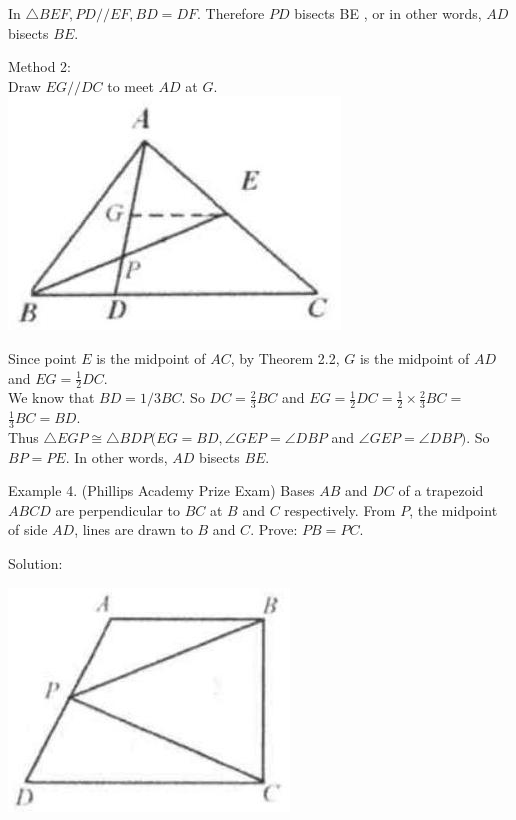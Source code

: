 \documentclass[10pt]{article}
\begin{document}
In \(\triangle B E F, P D / / E F, B D=D F\). Therefore \(P D\) bisects BE , or in other words, \(A D\) bisects \(B E\).

Method 2:\\
Draw \(E G / / D C\) to meet \(A D\) at \(G\).\\
\includegraphics[max width=\textwidth, center]{2025_04_17_97bc1f7e44d93c271a88g-036(3)}


Since point \(E\) is the midpoint of \(A C\), by Theorem 2.2, \(G\) is the midpoint of \(A D\) and \(E G=\frac{1}{2} D C\).\\
We know that \(B D=1 / 3 B C\). So \(D C=\frac{2}{3} B C\) and \(E G=\frac{1}{2} D C=\frac{1}{2} \times \frac{2}{3} B C=\) \(\frac{1}{3} B C=B D\).\\
Thus \(\triangle E G P \cong \triangle B D P(E G=B D, \angle G E P=\angle D B P\) and \(\angle G E P=\angle D B P)\). So \(B P=P E\). In other words, \(A D\) bisects \(B E\).

Example 4. (Phillips Academy Prize Exam) Bases \(A B\) and \(D C\) of a trapezoid \(A B C D\) are perpendicular to \(B C\) at \(B\) and \(C\) respectively. From \(P\), the midpoint of side \(A D\), lines are drawn to \(B\) and \(C\). Prove: \(P B=P C\).

Solution:
\begin{center}
\includegraphics[max width=\textwidth]{2025_04_17_97bc1f7e44d93c271a88g-037(2)}
\end{center}
\end{document}
